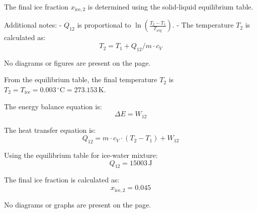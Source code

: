 The final ice fraction \( x_{\text{ice},2} \) is determined using the solid-liquid equilibrium table.  

Additional notes:  
- \( Q_{12} \) is proportional to \( \ln \left( \frac{T_2 - T_1}{T_{\text{avg}}} \right) \).  
- The temperature \( T_2 \) is calculated as:  
\[
T_2 = T_1 + Q_{12} / m \cdot c_V  
\]  

No diagrams or figures are present on the page.

From the equilibrium table, the final temperature \( T_2 \) is \( T_2 = T_{\text{ice}} = 0.003 \, ^\circ\text{C} = 273.153 \, \text{K} \).  

The energy balance equation is:  
\[
\Delta E = W_{12}
\]  

The heat transfer equation is:  
\[
Q_{12} = m \cdot c_V \cdot (T_2 - T_1) + W_{12}
\]  

Using the equilibrium table for ice-water mixture:  
\[
Q_{12} = 15003 \, \text{J}
\]  

The final ice fraction is calculated as:  
\[
x_{\text{ice},2} = 0.045
\]  

No diagrams or graphs are present on the page.